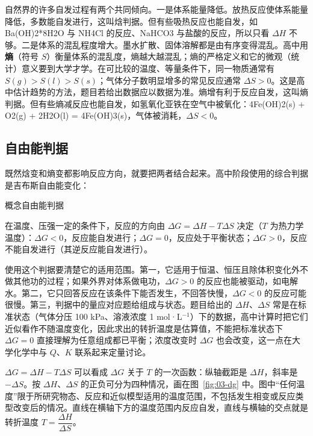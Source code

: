 \documentclass[UTF8,a4paper,zihao=5,oneside,openany,fontset=none]{ctexbook}
\def\heiti{\CJKfamily{zhhei}}
\def\mathrm#1{#1}\def\text#1{#1}\def\ensuremath#1{#1}\def\ce#1{#1}%
\newcommand{\textheading}[2]{\par\addvspace{.6em}\Needspace{4\baselineskip}\noindent
 {\heiti\if\relax\detokenize{#2}\relax #1\else #2\fi}\par\nobreak\smallskip\nobreak\color{black}\ignorespaces}
\newenvironment{gainian}[1][]{\textheading{概念}{#1}}{\par\smallskip}
\begin{document}
自然界的许多自发过程有两个共同倾向。一是体系能量降低。放热反应使体系能量降低，多数能自发进行，这叫焓判据。但有些吸热反应也能自发，如 \ce{Ba(OH)2*8H2O} 与 \ce{NH4Cl} 的反应、\ce{NaHCO3} 与盐酸的反应，所以只看 $\Delta H$ 不够。二是体系的混乱程度增大。墨水扩散、固体溶解都是由有序变得混乱。高中用\textbf{熵}（符号 $S$）衡量体系的混乱度，熵越大越混乱；熵的严格定义和它的微观（统计）意义要到大学才学。在可比较的温度、等量条件下，同一物质通常有 $S(\mathrm{g})>S(\mathrm{l})>S(\mathrm{s})$；气体分子数明显增多的常见反应通常 $\Delta S>0$。这是高中估计趋势的方法，题目若给出数据应以数据为准。熵增有利于反应自发，这叫熵判据。但有些熵减反应也能自发，如氢氧化亚铁在空气中被氧化：\ce{4Fe(OH)2(s) + O2(g) + 2H2O(l) = 4Fe(OH)3(s)}，气体被消耗，$\Delta S<0$。

\subsection{自由能判据}
既然焓变和熵变都影响反应方向，就要把两者结合起来。高中阶段使用的综合判据是吉布斯自由能变化：

\begin{gainian}[自由能判据]
在温度、压强一定的条件下，反应的方向由 $\Delta G=\Delta H-T\Delta S$ 决定（$T$ 为热力学温度）：$\Delta G<0$，反应能自发进行；$\Delta G=0$，反应处于平衡状态；$\Delta G>0$，反应不能自发进行（其逆反应能自发进行）。
\end{gainian}

使用这个判据要清楚它的适用范围。第一，它适用于恒温、恒压且除体积变化外不做其他功的过程；如果外界对体系做电功，$\Delta G>0$ 的反应也能被驱动，如电解水。第二，它只回答反应在该条件下能否发生，不回答快慢，$\Delta G<0$ 的反应可能很慢。第三，判据中的量应对应题给组成与状态。题目给出的 $\Delta H$、$\Delta S$ 常是在标准状态（气体分压 100 kPa、溶液浓度 1 mol·L$^{-1}$）下的数据，高中计算时把它们近似看作不随温度变化，因此求出的转折温度是估算值，不能把标准状态下 $\Delta G=0$ 直接理解为任意组成都已平衡；浓度改变时 $\Delta G$ 也会改变，这一点在大学化学中与 $Q$、$K$ 联系起来定量讨论。

$\Delta G=\Delta H-T\Delta S$ 可以看成 $\Delta G$ 关于 $T$ 的一次函数：纵轴截距是 $\Delta H$，斜率是 $-\Delta S$。按 $\Delta H$、$\Delta S$ 的正负可分为四种情况，画在图~\ref{fig:03-dg} 中。图中“任何温度”限于所研究物态、反应和近似模型适用的温度范围，不包括发生相变或反应类型改变后的情况。直线在横轴下方的温度范围内反应自发，直线与横轴的交点就是转折温度 $T=\dfrac{\Delta H}{\Delta S}$。
\end{document}
